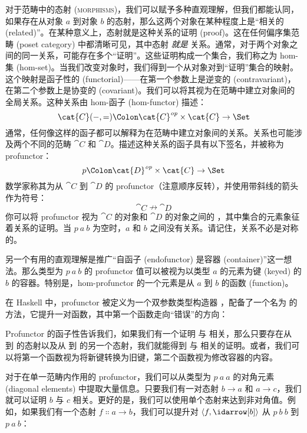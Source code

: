 
\lettrine[lhang=0.17]{对}{于范畴中的态射 (morphisms)}，我们可以赋予多种直观理解，但我们都能认同，如果存在从对象 $a$ 到对象 $b$ 的态射，那么这两个对象在某种程度上是“相关的 (related)”。在某种意义上，态射就是这种关系的证明 (proof)。这在任何偏序集范畴 (poset category) 中都清晰可见，其中态射 \emph{就是} 关系。通常，对于两个对象之间的同一关系，可能存在多个“证明”。这些证明构成一个集合，我们称之为 hom-集 (hom-set)。当我们改变对象时，我们得到一个从对象对到“证明”集合的映射。这个映射是函子性的 (functorial)——在第一个参数上是逆变的 (contravariant)，在第二个参数上是协变的 (covariant)。我们可以将其视为在范畴中建立对象间的全局关系。这种关系由 hom-函子 (hom-functor) 描述：
\[\cat{C}(-, =) \Colon \cat{C}^\mathit{op}\times{}\cat{C} \to \Set\]
通常，任何像这样的函子都可以解释为在范畴中建立对象间的关系。关系也可能涉及两个不同的范畴 $\cat{C}$ 和 $\cat{D}$。描述这种关系的函子具有以下签名，并被称为 profunctor：
\[p \Colon \cat{D}^\mathit{op}\times{}\cat{C} \to \Set\]
数学家称其为从 $\cat{C}$ 到 $\cat{D}$ 的 profunctor（注意顺序反转），并使用带斜线的箭头作为符号：
\[\cat{C} \nrightarrow \cat{D}\]
你可以将 profunctor 视为 $\cat{C}$ 的对象和 $\cat{D}$ 的对象之间的 ，其中集合的元素象征着关系的证明。当 $p\ a\ b$ 为空时，$a$ 和 $b$ 之间没有关系。请记住，关系不必是对称的。

另一个有用的直观理解是推广“自函子 (endofunctor) 是容器 (container)”这一想法。那么类型为 $p\ a\ b$ 的 profunctor 值可以被视为以类型 $a$ 的元素为键 (keyed) 的 $b$ 的容器。特别是，hom-profunctor 的一个元素是从 $a$ 到 $b$ 的函数 (function)。

在 Haskell 中，profunctor 被定义为一个双参数类型构造器 ，配备了一个名为  的方法，它提升一对函数，其中第一个函数走向“错误”的方向：

Profunctor 的函子性告诉我们，如果我们有一个证明  与  相关，那么只要存在从  到  的态射以及从  到  的另一个态射，我们就能得到  与  相关的证明。或者，我们可以将第一个函数视为将新键转换为旧键，第二个函数视为修改容器的内容。

对于在单一范畴内作用的 profunctor，我们可以从类型为 $p\ a\ a$ 的对角元素 (diagonal elements) 中提取大量信息。只要我们有一对态射 $b \to a$ 和 $a \to c$，我们就可以证明 $b$ 与 $c$ 相关。更好的是，我们可以使用单个态射来达到非对角值。例如，如果我们有一个态射 $f \Colon a \to b$，我们可以提升对 $\langle f, \idarrow[b] \rangle$ 从 $p\ b\ b$ 到 $p\ a\ b$：

